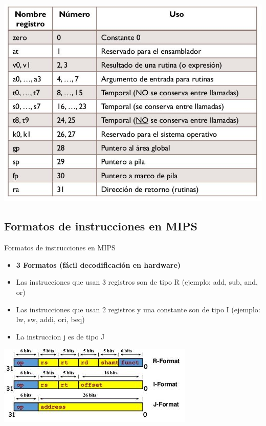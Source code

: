 \documentclass[aspectratio=169,compress]{beamer}
\begin{document}
\begin{footnotesize}
\begin{frame}
\begin{center}
\includegraphics[scale=0.3]{images/convencion.jpg}

        \end{center}
\end{frame}



\subsection{Formatos de instrucciones en MIPS}


\begin{frame}{Formatos de instrucciones en MIPS}

\begin{itemize}
	\item \textbf{3 Formatos (fácil decodificación en hardware)}
	\item Las instrucciones que usan 3 registros son de tipo R (ejemplo: add, sub, and, or)
	\item Las instrucciones que usan 2 registros y una constante son de tipo I (ejemplo: lw, sw, addi, ori, beq)
	\item La instruccion j es de tipo J
\end{itemize}

	\begin{center}
\includegraphics[scale=0.7]{images/formato.jpg} 
	\end{center}
\end{frame}




\end{footnotesize}
\end{document}
